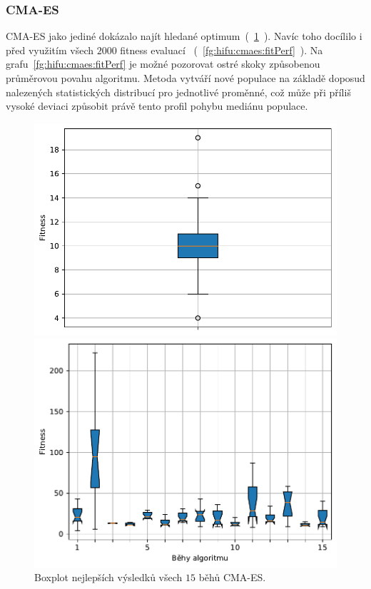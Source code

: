 \subsubsection{CMA-ES}
CMA-ES jako jediné dokázalo najít hledané optimum~(~\ref{fg:hifu:cmaes:best}~). Navíc toho docílilo i před využitím všech $2000$ fitness evaluací~ (~\ref{fg:hifu:cmaes:fitPerf}~). Na grafu~\ref{fg:hifu:cmaes:fitPerf} je možné pozorovat ostré skoky způsobenou průměrovou povahu algoritmu. Metoda vytváří nové populace na základě doposud nalezených statistických distribucí pro jednotlivé proměnné, což může při příliš vysoké deviaci způsobit právě tento profil pohybu mediánu populace.

\begin{figure}[H]
    \begin{minipage}[t]{0.475\linewidth}
        \includegraphics[width=\linewidth]{obrazky-figures/statistics/HIFU/blob/4/CMAES/bestsBoxplot_WithOutliers.pdf}
        \caption{Boxplot nejlepších výsledků všech $15$ běhů CMA-ES.}
        \label{fg:hifu:cmaes:best}
        \end{minipage}
        \hfill
        \begin{minipage}[t]{0.475\linewidth}
        \includegraphics[width=\linewidth]{obrazky-figures/statistics/HIFU/blob/4/CMAES/lastGenBoxplots.pdf}

\end{minipage}
\end{figure}

